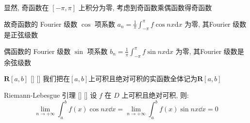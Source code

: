 \documentclass[UTF8]{ctexart}
\begin{document}
            \begin{prf}
				显然, 奇函数在 \([-\pi,\pi]\) 上积分为零, 考虑到奇函数乘偶函数得奇函数

				故奇函数的 Fourier 级数 \(\cos\) 项系数 \(a_n=\frac{1}{\pi}\int_{-\pi}^{\pi}f\cos nx\text{d}x\) 为零, 其Fourier 级数是正弦级数

				偶函数的 Fourier 级数 \(\sin\) 项系数 \(b_n=\frac{1}{\pi}\int_{-\pi}^{\pi}f\sin nx\text{d}x\) 为零, 其Fourier 级数是余弦级数
			\end{prf}

			\begin{dfn}
				[]
			    {\(\mathbf{R}[a,b]\)}
			    []
			    []
				我们把在\([a,b]\)上可积且绝对可积的实函数全体记为\(\mathbf{R}[a,b]\)
			\end{dfn}

			\begin{thm}
			    []
			    {Riemann-Lebesgue 引理}
			    []
			    []
				设 \(f\) 在 \(D\) 上可积且绝对可积, 则: 
				\[\lim_{n\to+\infty}\int_a^b f(x)\cos nx\dd x=\lim_{n\to+\infty}\int_a^b f(x)\sin nx\dd x=0\]
			\end{thm}
\end{document}
